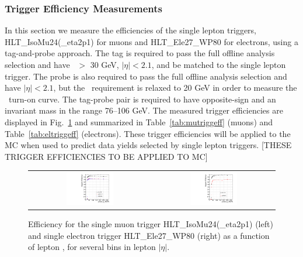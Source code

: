 \clearpage

\subsubsection{Trigger Efficiency Measurements}

In this section we measure the efficiencies of the single lepton triggers, HLT\_IsoMu24(\_eta2p1) for muons and HLT\_Ele27\_WP80 for electrons, using a tag-and-probe
approach. The tag is required to pass the full offline analysis selection and have \pt\ $>$ 30 GeV, $|\eta|<2.1$, and be matched to the single
lepton trigger. The probe is also required to pass the full offline analysis selection and have $|\eta|<2.1$, but the \pt\ requirement is relaxed to 20 GeV
in order to measure the \pt\ turn-on curve. The tag-probe pair is required to have opposite-sign and an invariant mass in the range 76--106 GeV.
The measured trigger efficiencies are displayed in Fig.~\ref{fig:trigeff} and summarized in Table~\ref{tab:mutriggeff} (muons) and Table~\ref{tab:eltriggeff} (electrons).
These trigger efficiencies will be applied to the MC when used to predict data yields selected by single lepton triggers. [THESE TRIGGER EFFICIENCIES TO BE APPLIED TO MC]


\begin{figure}[!ht]
\begin{center}
\begin{tabular}{cc}
\includegraphics[width=0.4\textwidth]{plots/mutrig_pt_etabins.pdf} &
\includegraphics[width=0.4\textwidth]{plots/eltrig_pt_etabins.pdf} \\
\end{tabular}
\caption{\label{fig:trigeff}
Efficiency for the single muon trigger HLT\_IsoMu24(\_eta2p1) (left) and single electron trigger HLT\_Ele27\_WP80 (right) as a function of lepton \pt,
for several bins in lepton $|\eta|$.
}
\end{center}
\end{figure}

